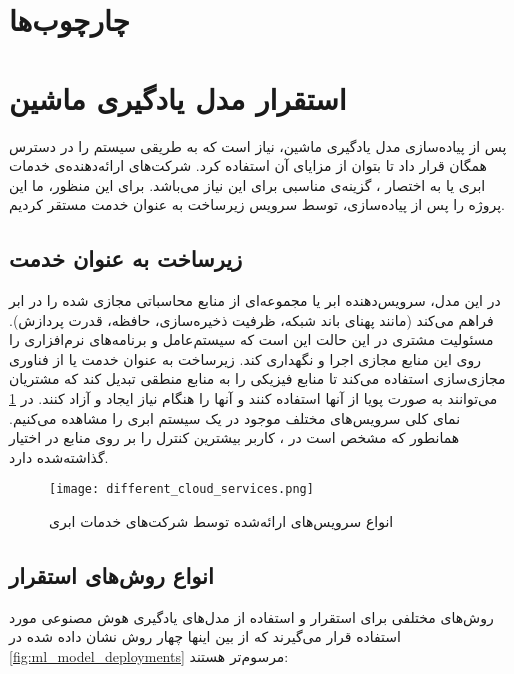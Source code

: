 \section{چارچوب‌ها}



\section{استقرار مدل یادگیری ماشین}
پس از پیاده‌سازی مدل یادگیری ماشین، نیاز است که به طریقی سیستم را در دسترس همگان قرار داد تا بتوان از مزایای آن استفاده کرد. شرکت‌های ارائه‌دهنده‌ی خدمات ابری یا به اختصار ، گزینه‌ی مناسبی برای این نیاز می‌باشد. برای این منظور، ما این پروژه را پس از پیاده‌سازی، توسط سرویس زیرساخت به عنوان خدمت مستقر کردیم.

\subsection{زیرساخت به عنوان خدمت}
در این مدل، سرویس‌دهنده ابر یا  مجموعه‌ای از منابع محاسباتی مجازی شده را در ابر فراهم می‌کند (مانند پهنای باند شبکه، ظرفیت ذخیره‌سازی، حافظه، قدرت پردازش). مسئولیت مشتری در این حالت این است که سیستم‌عامل و برنامه‌های نرم‌افزاری را روی این منابع مجازی اجرا و نگهداری کند. زیرساخت به عنوان خدمت یا  از فناوری مجازی‌سازی استفاده می‌کند تا منابع فیزیکی را به منابع منطقی تبدیل کند که مشتریان می‌توانند به صورت پویا از آنها استفاده کنند و آنها را هنگام نیاز ایجاد و آزاد کنند\cite{youssef2012exploring}. در \cref{fig:different_cloud_services} نمای کلی سرویس‌های مختلف موجود در یک سیستم ابری را مشاهده می‌کنیم. همانطور که مشخص است در ، کاربر بیشترین کنترل را بر روی منابع در اختیار گذاشته‌شده دارد\cite{serrano2015infrastructure}.



\begin{figure}[!h]
\centerline{\texttt{[image: different\_cloud\_services.png]}}
\caption{انواع سرویس‌های ارائه‌شده توسط شرکت‌های خدمات ابری}
\label{fig:different_cloud_services}
\end{figure}


\subsection{انواع روش‌های استقرار}
 روش‌های مختلفی برای استقرار و استفاده از مدل‌های یادگیری هوش مصنوعی مورد استفاده قرار می‌گیرند که از بین اینها چهار روش نشان داده‌ شده در \cref{fig:ml_model_deployments} مرسوم‌تر هستند\cite{kaggleMLdeployments}:

